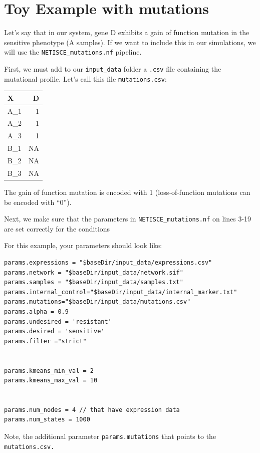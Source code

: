 \documentclass[
]{book}
\begin{document}
\hypertarget{toy-example-with-mutations}{%
\section{Toy Example with mutations}\label{toy-example-with-mutations}}

Let's say that in our system, gene D exhibits a gain of function mutation in the sensitive phenotype (A samples). If we want to include this in our simulations, we will use the \texttt{NETISCE\_mutations.nf} pipeline.

First, we must add to our \texttt{input\_data} folder a \texttt{.csv} file containing the mutational profile. Let's call this file \texttt{mutations.csv}:

\begin{tabular}{l|r}
\hline
X & D\\
\hline
A\_1 & 1\\
\hline
A\_2 & 1\\
\hline
A\_3 & 1\\
\hline
B\_1 & NA\\
\hline
B\_2 & NA\\
\hline
B\_3 & NA\\
\hline
\end{tabular}

The gain of function mutation is encoded with 1 (loss-of-function mutations can be encoded with ``0'').

Next, we make sure that the parameters in \texttt{NETISCE\_mutations.nf} on lines 3-19 are set correctly for the conditions

For this example, your parameters should look like:

\begin{verbatim}
params.expressions = "$baseDir/input_data/expressions.csv"
params.network = "$baseDir/input_data/network.sif"
params.samples = "$baseDir/input_data/samples.txt"
params.internal_control="$baseDir/input_data/internal_marker.txt"
params.mutations="$baseDir/input_data/mutations.csv"
params.alpha = 0.9
params.undesired = 'resistant'
params.desired = 'sensitive'
params.filter ="strict"


params.kmeans_min_val = 2
params.kmeans_max_val = 10


params.num_nodes = 4 // that have expression data
params.num_states = 1000
\end{verbatim}

Note, the additional parameter \texttt{params.mutations} that points to the \texttt{mutations.csv.}
\end{document}
